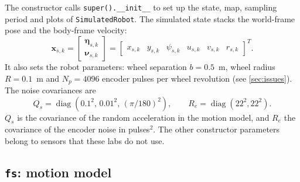 \documentclass[letterpaper,12pt]{article}
\begin{document}
The constructor calls \texttt{super().\_\_init\_\_} to set up the state, map,
sampling period and plots of \texttt{SimulatedRobot}. The simulated state
stacks the world-frame pose and the body-frame velocity:
\begin{equation}
    \boldsymbol{x}_{s,k}=
    \begin{bmatrix}
        \boldsymbol{\eta}_{s,k}\\
        \boldsymbol{\nu}_{s,k}
    \end{bmatrix}
    =
    \begin{bmatrix}
        x_{s,k}&y_{s,k}&\psi_{s,k}&u_{s,k}&v_{s,k}&r_{s,k}
    \end{bmatrix}^{T}.
\end{equation}
It also sets the robot parameters: wheel separation $b=0.5$~m, wheel radius
$R=0.1$~m and $N_p=4096$ encoder pulses per wheel revolution
(see \cref{sec:issues}). The noise covariances are
\begin{equation}
    Q_s=\operatorname{diag}\left(0.1^2,\,0.01^2,\,
    (\pi/180)^2\right),\qquad
    R_e=\operatorname{diag}(22^2,22^2).
\end{equation}
$Q_s$ is the covariance of the random acceleration in the motion model, and
$R_e$ the covariance of the encoder noise in pulses$^2$. The other
constructor parameters belong to sensors that these labs do not use.

\subsection{\texttt{fs}: motion model}
\end{document}
